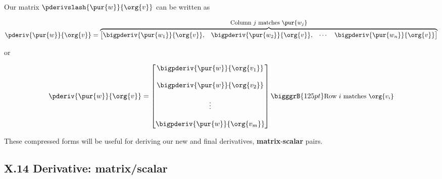         \begin{notation}
            Our matrix $\pderivslash{ \pur{w} }{ \org{v} }$ can be written as
            
            \begin{equation*}
                \pderiv{ \pur{w} }{ \org{v} } 
                =
                \overbrace{
                    \begin{bmatrix}
                        \bigpderiv{ \pur{w_1} }{ \org{v} }, &
                        \bigpderiv{ \pur{w_2} }{ \org{v} }, &
                        \cdots &
                        \bigpderiv{ \pur{w_n} }{ \org{v} } 
                    \end{bmatrix}
                }^{ \text{\small Column $j$ matches $\pur{w_j}$} }
            \end{equation*}
            
            \phantom{}
            
            \centerline{or \phantom{xxxxxxxxxx}}
            
            \phantom{}
            
            \begin{equation*}
                \pderiv{ \pur{w} }{ \org{v} } 
                =
                \begin{bmatrix}
                    \bigpderiv{ \pur{w} }   { \org{v_1} }\\ 
                    \\
                    \bigpderiv{ \pur{w} }   { \org{v_2} }\\ 
                    \\
                    \vdots \\ 
                    \\
                    \bigpderiv{ \pur{w} }   { \org{v_m} }
                \end{bmatrix}
                \bigggrB{125pt} \text{\small Row $i$ matches $\org{v_i}$} 
            \end{equation*}
        \end{notation}
        
        These compressed forms will be useful for deriving our new and final derivatives, \textbf{matrix}-\textbf{scalar} pairs.
            
    \secdiv
    
    \subsection*{X.14 \quad Derivative: matrix/scalar}
    

